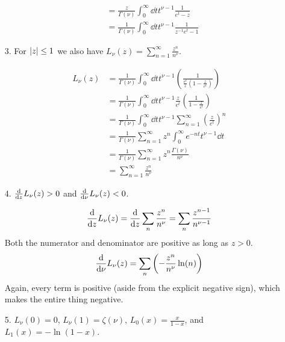\documentclass[a4paper,twoside]{article}
\begin{document}
\begin{itemize}
\begin{problem}
\begin{align}
                &= \frac{z}{\Gamma(\nu)} \int_0^{\infty} \dd{t} t^{\nu - 1} \frac{1}{e^t - z} \\
                &= \frac{1}{\Gamma(\nu)} \int_0^{\infty} \dd{t} t^{\nu - 1} \frac{1}{z^{-1} e^{t} - 1}
            \end{align}
        \end{problem}
    \item[3.] For $ \abs{z} \leq 1 $ we also have $ L_{\nu}(z) = \sum_{n=1}^{\infty} \frac{z^n}{n^{\nu}} $.
        \begin{problem}
            \begin{align}
                L_{\nu}(z) &= \frac{1}{\Gamma(\nu)} \int_0^{\infty} \dd{t} t^{\nu - 1} \left( \frac{1}{\frac{e^t}{z} \left( 1 - \frac{z}{e^t} \right)} \right) \\
                &= \frac{1}{\Gamma(\nu)} \int_0^{\infty} \dd{t} t^{\nu - 1} \frac{z}{e^t} \left( \frac{1}{1 - \frac{z}{e^t}} \right) \\
                &= \frac{1}{\Gamma(\nu)} \int_0^{\infty} \dd{t} t^{\nu - 1} \sum_{n=1}^{\infty} \left( \frac{z}{e^t} \right)^n \\
                &= \frac{1}{\Gamma(\nu)} \sum_{n=1}^{\infty} z^n \int_0^{\infty} e^{-nt} t^{\nu - 1} \dd{t} \\
                &= \frac{1}{\Gamma(\nu)} \sum_{n=1}^{\infty} z^n \frac{\Gamma(\nu)}{n^{\nu}} \\
                &= \sum_{n=1}^{\infty} \frac{z^n}{n^{\nu}}
            \end{align}
        \end{problem}
    \item[4.] $ \dv{z}L_{\nu}(z) > 0 $ and $ \dv{\nu}L_{\nu}(z) < 0 $.
        \begin{problem}
            \begin{equation}
                \dv{z}L_{\nu}(z) = \dv{z} \sum_n \frac{z^n}{n^{\nu}} = \sum_{n} \frac{z^{n - 1}}{n^{\nu - 1}}
            \end{equation}
            Both the numerator and denominator are positive as long as $ z > 0 $.
            \begin{equation}
                \dv{\nu}L_{\nu}(z) = \sum_n \left( - \frac{z^n}{n^{\nu}} \ln(n) \right)
            \end{equation}
            Again, every term is positive (aside from the explicit negative sign), which makes the entire thing negative.
        \end{problem}
    \item[5.] $ L_{\nu}(0) = 0 $, $ L_{\nu}(1) = \zeta(\nu) $, $ L_0(x) = \frac{x}{1-x} $, and $ L_1(x) = - \ln(1-x) $.

\end{itemize}
\end{document}
